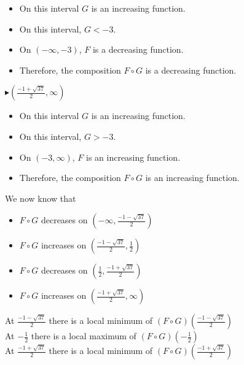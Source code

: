\documentclass{ximera}
\begin{document}
\begin{example}
\begin{itemize}
\item On this interval $G$ is an increasing function.
\item On this interval, $G < -3$.
\item On $(-\infty, -3)$, $F$ is a decreasing function.
\item Therefore, the composition $F \circ G$ is a decreasing function.
\end{itemize}










\textbf{\textcolor{blue!55!black}{$\blacktriangleright (\frac{-1 + \sqrt{37}}{2}, \infty)$}}


\begin{itemize}
\item On this interval $G$ is an increasing function.
\item On this interval, $G > -3$.
\item On $(-3, \infty)$, $F$ is an increasing function.
\item Therefore, the composition $F \circ G$ is an increasing function.
\end{itemize}





We now know that 

\begin{itemize}
\item $F \circ G$ decreases on $(-\infty, \frac{-1 - \sqrt{37}}{2})$ \\
\item $F \circ G$ increases on $(\frac{-1 - \sqrt{37}}{2}, \frac{1}{2})$ \\
\item $F \circ G$ decreases on $(\frac{1}{2}, \frac{-1 + \sqrt{37}}{2})$ \\
\item $F \circ G$ increases on $(\frac{-1 + \sqrt{37}}{2}, \infty)$
\end{itemize}




At $\frac{-1 - \sqrt{37}}{2}$ there is a local minimum of $(F \circ G)\left( \frac{-1 - \sqrt{37}}{2} \right)$ \\


At $-\frac{1}{2}$ there is a local maximum of $(F \circ G)\left( -\frac{1}{2} \right)$ \\


At $\frac{-1 + \sqrt{37}}{2}$ there is a local minimum of $(F \circ G)\left( \frac{-1 + \sqrt{37}}{2} \right)$ \\




\end{example}
\end{document}
